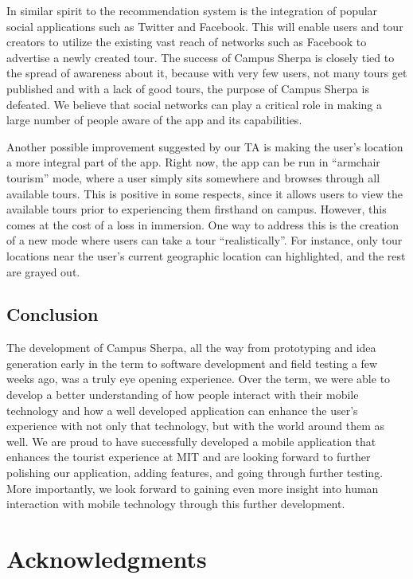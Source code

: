 \documentclass{sigchi}
\begin{document}
In similar spirit to the recommendation system is the integration of popular social applications such as Twitter and Facebook. This will enable users and tour creators to utilize the existing vast reach of networks such as Facebook to advertise a newly created tour. The success of Campus Sherpa is closely tied to the spread of awareness about it, because with very few users, not many tours get published and with a lack of good tours, the purpose of Campus Sherpa is defeated. We believe that social networks can play a critical role in making a large number of people aware of the app and its capabilities. 

Another possible improvement suggested by our TA is making the user's location a more integral part of the app. Right now, the app can be run in ``armchair tourism'' mode, where a user simply sits somewhere and browses through all available tours. This is positive in some respects, since it allows users to view the available tours prior to experiencing them firsthand on campus. However, this comes at the cost of a loss in immersion. One way to address this is the creation of a new mode where users can take a tour ``realistically''. For instance, only tour locations near the user's current geographic location can highlighted, and the rest are grayed out. 

\subsection{Conclusion}

The development of Campus Sherpa, all the way from prototyping and idea generation early in the term to software development and field testing a few weeks ago, was a truly eye opening experience. Over the term, we were able to develop a better understanding of how people interact with their mobile technology and how a well developed application can enhance the user's experience with not only that technology, but with the world around them as well. We are proud to have successfully developed a mobile application that enhances the tourist experience at MIT and are looking forward to further polishing our application, adding features, and going through further testing. More importantly, we look forward to gaining even more insight into human interaction with mobile technology through this further development. 



\section{Acknowledgments}
\end{document}
